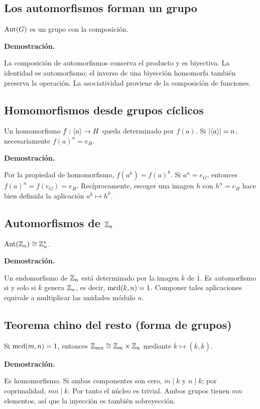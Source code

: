 \documentclass[11pt,a4paper]{article}
\begin{document}
\subsection{Los automorfismos forman un grupo}
\begin{resultado}
$\operatorname{Aut}(G)$ es un grupo con la composición.
\end{resultado}
\textbf{Demostración.}
\begin{demostracion}
La composición de automorfismos conserva el producto y es biyectiva. La identidad es automorfismo; el inverso de una biyección homomorfa también preserva la operación. La asociatividad proviene de la composición de funciones.
\end{demostracion}


\subsection{Homomorfismos desde grupos cíclicos}
\begin{resultado}
Un homomorfismo $f:\langle a\rangle\to H$ queda determinado por $f(a)$. Si $|\langle a\rangle|=n$, necesariamente $f(a)^n=e_H$.
\end{resultado}
\textbf{Demostración.}
\begin{demostracion}
Por la propiedad de homomorfismo, $f(a^k)=f(a)^k$. Si $a^n=e_G$, entonces $f(a)^n=f(e_G)=e_H$. Recíprocamente, escoger una imagen $h$ con $h^n=e_H$ hace bien definida la aplicación $a^k\mapsto h^k$.
\end{demostracion}


\subsection{Automorfismos de $\mathbb{Z}_n$}
\begin{resultado}
$\operatorname{Aut}(\mathbb{Z}_n)\cong\mathbb{Z}_n^*$.
\end{resultado}
\textbf{Demostración.}
\begin{demostracion}
Un endomorfismo de $\mathbb{Z}_n$ está determinado por la imagen $\overline k$ de $\overline1$. Es automorfismo si y solo si $\overline k$ genera $\mathbb{Z}_n$, es decir, $\operatorname{mcd}(k,n)=1$. Componer tales aplicaciones equivale a multiplicar las unidades módulo $n$.
\end{demostracion}


\subsection{Teorema chino del resto (forma de grupos)}
\begin{resultado}
Si $\operatorname{mcd}(m,n)=1$, entonces $\mathbb{Z}_{mn}\cong\mathbb{Z}_m\times\mathbb{Z}_n$ mediante $\overline k\mapsto(\overline k,\overline k)$.
\end{resultado}
\textbf{Demostración.}
\begin{demostracion}
Es homomorfismo. Si ambas componentes son cero, $m\mid k$ y $n\mid k$; por coprimalidad, $mn\mid k$. Por tanto el núcleo es trivial. Ambos grupos tienen $mn$ elementos, así que la inyección es también sobreyección.
\end{demostracion}
\end{document}
